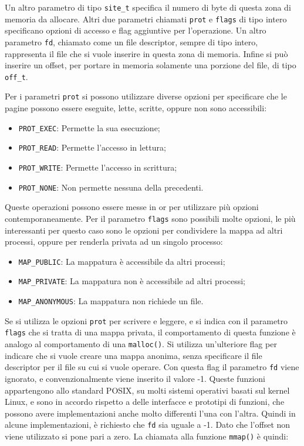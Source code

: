 \documentclass{article}
\numberwithin{equation}{subsection}
\begin{document}
Un altro parametro di tipo \verb|site_t| specifica il numero di byte di questa zona di memoria da 
allocare. Altri due parametri chiamati \verb|prot| e \verb|flags| di tipo intero specificano 
opzioni di accesso e flag aggiuntive per l'operazione. Un altro parametro \verb|fd|, chiamato 
come un file descriptor, sempre di tipo intero, rappresenta il file che si vuole inserire in questa zona di memoria. Infine si può inserire un offset, per portare in memoria solamente una 
porzione del file, di tipo \verb|off_t|. 

Per i parametri \verb|prot| si possono utilizzare diverse opzioni per 
specificare che le pagine possono essere eseguite, lette, scritte, oppure non sono 
accessibili:
\begin{itemize}
    \item \verb|PROT_EXEC|: Permette la sua esecuzione;
    \item \verb|PROT_READ|: Permette l'accesso in lettura;
    \item \verb|PROT_WRITE|: Permette l'accesso in scrittura;
    \item \verb|PROT_NONE|: Non permette nessuna della precedenti. 
\end{itemize}
Queste operazioni possono essere messe in or per utilizzare più opzioni 
contemporaneamente. Per il parametro \verb|flags| sono possibili molte opzioni, le 
più interessanti per questo caso sono le opzioni per condividere la mappa ad altri processi, oppure per renderla privata ad un singolo processo:
\begin{itemize}
    \item \verb|MAP_PUBLIC|: La mappatura è accessibile da altri processi;
    \item \verb|MAP_PRIVATE|: La mappatura non è accessibile ad altri processi;
    \item \verb|MAP_ANONYMOUS|: La mappatura non richiede un file.
\end{itemize} 
Se si utilizza le opzioni \verb|prot| per scrivere e leggere, e si indica con il parametro \verb|flags| che si tratta di una mappa privata, il comportamento di questa funzione è analogo al 
comportamento di una \verb|malloc()|. 
Si utilizza un'ulteriore flag per indicare che si vuole creare una mappa anonima, senza 
specificare il file descriptor per il file su cui si vuole operare. Con questa flag il parametro 
\verb|fd| viene ignorato, e convenzionalmente viene inserito il valore -1. 
Queste funzioni appartengono allo standard POSIX, su molti sistemi operativi basati sul kernel Linux, e sono in accordo rispetto a delle interfacce e prototipi di funzioni, che possono 
avere implementazioni anche molto differenti l'una con l'altra. Quindi in alcune implementazioni, è richiesto che \verb|fd| sia uguale a -1. Dato che l'offset non viene utilizzato si pone pari a zero. La chiamata alla funzione \verb|mmap()| è quindi:
\inputminted[firstline=32,lastline=33]{c}{./"Esercitazione del 19-11-24"/domanda4.c}
\end{document}
